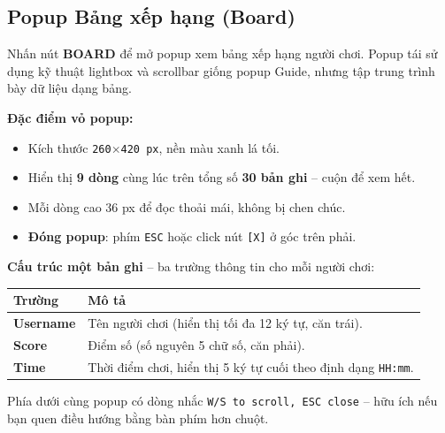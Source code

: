 \documentclass[12pt,a4paper]{article}
\begin{document}
\noindent{}

\subsection{Popup Bảng xếp hạng (Board)}
Nhấn nút \textbf{BOARD} để mở popup xem bảng xếp hạng người chơi.
Popup tái sử dụng kỹ thuật lightbox và scrollbar giống popup Guide, nhưng tập trung trình bày dữ liệu dạng bảng.

\vspace{4pt}
\noindent\textbf{Đặc điểm vỏ popup:}
\begin{itemize}
    \item Kích thước \texttt{260$\times$420 px}, nền màu xanh lá tối.
    \item Hiển thị \textbf{9 dòng} cùng lúc trên tổng số \textbf{30 bản ghi} -- cuộn để xem hết.
    \item Mỗi dòng cao 36 px để đọc thoải mái, không bị chen chúc.
    \item \textbf{Đóng popup}: phím \texttt{ESC} hoặc click nút \texttt{[X]} ở góc trên phải.
\end{itemize}

\noindent\textbf{Cấu trúc một bản ghi} -- ba trường thông tin cho mỗi người chơi:

\vspace{4pt}
\begin{tabularx}{\linewidth}{|l|X|}
    \hline
    \textbf{Trường} & \textbf{Mô tả} \\
    \hline
    \textbf{Username} & Tên người chơi (hiển thị tối đa 12 ký tự, căn trái). \\
    \hline
    \textbf{Score}    & Điểm số (số nguyên 5 chữ số, căn phải). \\
    \hline
    \textbf{Time}     & Thời điểm chơi, hiển thị 5 ký tự cuối theo định dạng \texttt{HH:mm}. \\
    \hline
\end{tabularx}

\vspace{4pt}
\noindent Phía dưới cùng popup có dòng nhắc \texttt{W/S to scroll, ESC close} -- hữu ích nếu bạn quen điều hướng bằng bàn phím hơn chuột.
\end{document}
